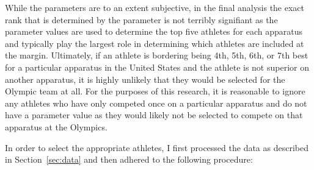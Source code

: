 \documentclass[12pt]{article}
\begin{document}
While the parameters are to an extent subjective, in the final analysis the exact rank that 
is determined by the parameter is not terribly signifiant as the parameter values are used to determine the top five 
athletes for each apparatus and typically play the largest role in determining which athletes are included at the margin. 
Ultimately, if an athlete is bordering being 4th, 5th, 6th, or 7th best for a particular apparatus in the United States 
and the athlete is not superior on another apparatus, it is highly unlikely that they would be selected for the Olympic 
team at all. For the purposes of this research, it is reasonable to ignore any athletes who have only competed once 
on a particular apparatus and do not have a parameter value as they would 
likely not be selected to compete on that apparatus at the Olympics.

In order to select the appropriate athletes, I first processed the data as described in Section~\ref{sec:data} 
and then adhered to the following procedure:
\end{document}
